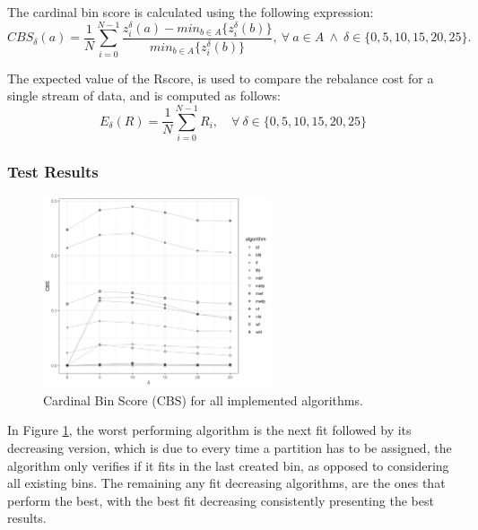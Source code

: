 The cardinal bin score is calculated using the following expression:
\begin{equation}
    CBS_\delta(a) = \frac{1}{N}
        \sum_{i=0}^{N-1} 
            \frac{  z_i^\delta(a) - min_{b \in A} \{z_i^\delta(b)\} }
                 {min_{b \in A} \{z_i^\delta(b)\} }, \ 
        \forall \ a \in A \ \wedge \ \delta \in \{0, 5, 10, 15, 20, 25\}. 
\end{equation}

The expected value of the Rscore, is used to compare the rebalance cost for a
single stream of data, and is computed as follows:
\begin{equation}
    E_\delta(R) = \frac{1}{N} 
        \sum_{i=0}^{N-1} R_i, \quad
        \forall \ \delta \in \{0, 5, 10, 15, 20, 25\}
\end{equation}

\subsubsection{Test Results}
\label{subsub:test_results}

\begin{figure}[htb!] 
\centering
\includegraphics[width=0.6\textwidth]{images/controller/relative.png} 
\caption{
    Cardinal Bin Score (CBS) for all implemented algorithms.
} 
\label{fig:relative_nconsumers} 
\end{figure}

In Figure \ref{fig:relative_nconsumers}, the worst performing algorithm is the
next fit followed by its decreasing version, which is due to every time a
partition has to be assigned, the algorithm only verifies if it fits in the last
created bin, as opposed to considering all existing bins. The remaining any fit
decreasing algorithms, are the ones that perform the best, with the best fit
decreasing consistently presenting the best results. 

